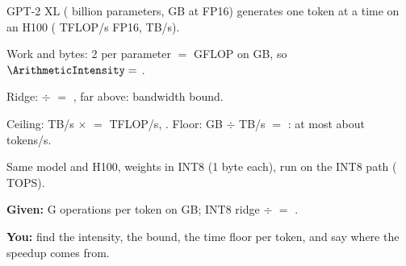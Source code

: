 \documentclass{studysheet}
\begin{document}
\begin{leftcol}
\begin{practicebox}
GPT-2 XL ( billion parameters,  GB at FP16) generates one token at a time on an H100
( TFLOP/s FP16,  TB/s).
\begin{steps}
\item Work and bytes: 2 per parameter $=$  GFLOP on  GB, so
  $\ArithmeticIntensity =$ .
\item Ridge:  $\div$  $=$ , far above: bandwidth bound.
\item Ceiling:  TB/s $\times$  $=$  TFLOP/s, .
  Floor:  GB $\div$  TB/s $=$ : at most about  tokens/s.
\end{steps}
\end{practicebox}

\vspace{12pt}
\begin{practicebox}
Same model and H100, weights in INT8 (1 byte each), run on the INT8 path ( TOPS).\par\vspace{4pt}
\textbf{Given:}  G operations per token on  GB; INT8 ridge
 $\div$  $=$ .\par
\textbf{You:} find the intensity, the bound, the time floor per token, and say where the speedup comes from.
\end{practicebox}
\end{leftcol}%
\end{document}
